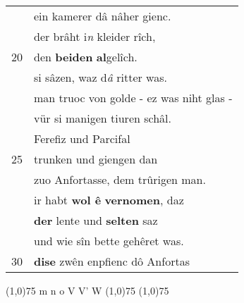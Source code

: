 \documentclass[8pt,a4paper,notitlepage]{article}
\begin{document}
\begin{table}[ht]
\begin{minipage}[t]{0.5\linewidth}
\begin{tabular}{rl}
 & ein kamerer dâ nâher gienc.\\ 
 & der brâht i\textit{n} kleider rîch,\\ 
20 & den \textbf{beiden} \textbf{al}gelîch.\\ 
 & si sâzen, waz d\textit{â} ritter was.\\ 
 & man truoc von golde - ez was niht glas -\\ 
 & vür si manigen tiuren schâl.\\ 
 & Ferefiz und Parcifal\\ 
25 & trunken und giengen dan\\ 
 & zuo Anfortasse, dem trûrigen man.\\ 
 & ir habt \textbf{wol ê} \textbf{vernomen}, daz\\ 
 & \textbf{der} lente und \textbf{selten} saz\\ 
 & und wie sîn bette gehêret was.\\ 
30 & \textbf{dise} zwên enpfienc dô Anfortas\\ 
\end{tabular}
\scriptsize
\line(1,0){75} \newline
m n o V V' W \newline
\line(1,0){75} \newline
\newline
\line(1,0){75} \newline

\end{minipage}
\end{table}
\end{document}

